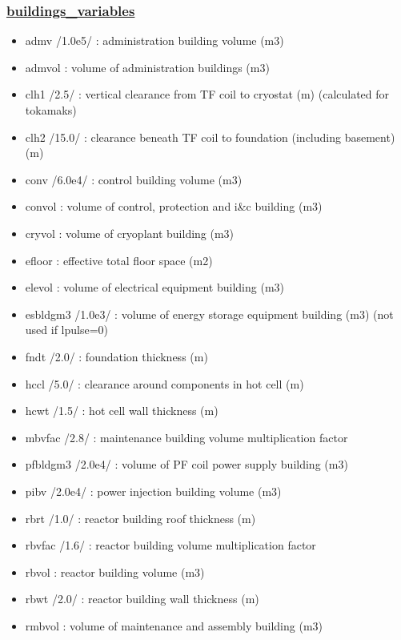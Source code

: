\documentclass[]{article}
\providecommand{\tightlist}{%
  \setlength{\itemsep}{0pt}\setlength{\parskip}{0pt}}
\begin{document}
\hypertarget{buildings_variables}{%
\subsubsection{\texorpdfstring{\href{buildings_variables.html}{buildings\_variables}}{buildings\_variables}}\label{buildings_variables}}

\begin{itemize}
\tightlist
\item
  admv /1.0e5/ : administration building volume (m3)
\item
  admvol : volume of administration buildings (m3)
\item
  clh1 /2.5/ : vertical clearance from TF coil to cryostat (m)
  (calculated for tokamaks)
\item
  clh2 /15.0/ : clearance beneath TF coil to foundation (including
  basement) (m)
\item
  conv /6.0e4/ : control building volume (m3)
\item
  convol : volume of control, protection and i\&c building (m3)
\item
  cryvol : volume of cryoplant building (m3)
\item
  efloor : effective total floor space (m2)
\item
  elevol : volume of electrical equipment building (m3)
\item
  esbldgm3 /1.0e3/ : volume of energy storage equipment building (m3)
  (not used if lpulse=0)
\item
  fndt /2.0/ : foundation thickness (m)
\item
  hccl /5.0/ : clearance around components in hot cell (m)
\item
  hcwt /1.5/ : hot cell wall thickness (m)
\item
  mbvfac /2.8/ : maintenance building volume multiplication factor
\item
  pfbldgm3 /2.0e4/ : volume of PF coil power supply building (m3)
\item
  pibv /2.0e4/ : power injection building volume (m3)
\item
  rbrt /1.0/ : reactor building roof thickness (m)
\item
  rbvfac /1.6/ : reactor building volume multiplication factor
\item
  rbvol : reactor building volume (m3)
\item
  rbwt /2.0/ : reactor building wall thickness (m)
\item
  rmbvol : volume of maintenance and assembly building (m3)

\end{itemize}
\end{document}
